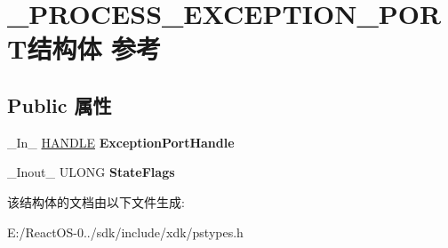 \hypertarget{struct___p_r_o_c_e_s_s___e_x_c_e_p_t_i_o_n___p_o_r_t}{}\section{\+\_\+\+P\+R\+O\+C\+E\+S\+S\+\_\+\+E\+X\+C\+E\+P\+T\+I\+O\+N\+\_\+\+P\+O\+R\+T结构体 参考}
\label{struct___p_r_o_c_e_s_s___e_x_c_e_p_t_i_o_n___p_o_r_t}
\subsection*{Public 属性}
\begin{DoxyCompactItemize}
\item 
\mbox{\label{struct___p_r_o_c_e_s_s___e_x_c_e_p_t_i_o_n___p_o_r_t_a8d60a4d6fe7e875cc37c4734c1713349}} 
\+\_\+\+In\+\_\+ \hyperlink{interfacevoid}{H\+A\+N\+D\+LE} {\bfseries Exception\+Port\+Handle}
\item 
\mbox{\label{struct___p_r_o_c_e_s_s___e_x_c_e_p_t_i_o_n___p_o_r_t_a2434134ada60c9174dc1b2dbfc89c761}} 
\+\_\+\+Inout\+\_\+ U\+L\+O\+NG {\bfseries State\+Flags}
\end{DoxyCompactItemize}


该结构体的文档由以下文件生成\+:\begin{DoxyCompactItemize}
\item 
E\+:/\+React\+O\+S-\/0../sdk/include/xdk/pstypes.\+h\end{DoxyCompactItemize}
